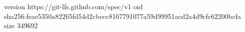 version https://git-lfs.github.com/spec/v1
oid sha256:feae5350a82265fd54d2cbccc8167791077a59d99951acd2a4d9cfc62200bcfa
size 349692
